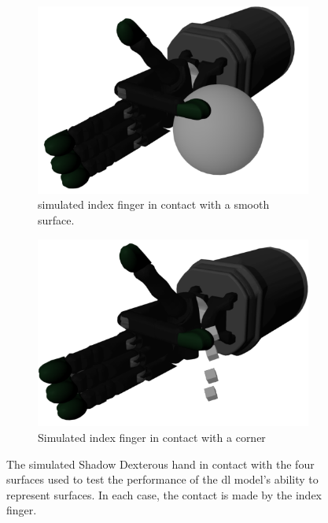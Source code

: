 \begin{figure}[h]
\begin{subfigure}[b]{0.24\textwidth}
	\end{subfigure}
	\hfill
	\begin{subfigure}[b]{0.24\textwidth}
		\centering
		\includegraphics[width=\textwidth]{chapters/1-tactile-perception/fig/experimental-setup/smooth-contact.png}
		\caption{simulated index finger in contact with a smooth surface.}
		\label{fig:smooth-contact-experimental}
	\end{subfigure}
	\hfill
	\begin{subfigure}[b]{0.24\textwidth}
		\centering
		\includegraphics[width=\textwidth]{chapters/1-tactile-perception/fig/experimental-setup/corner-contact.png}
		\caption{Simulated index finger in contact with a corner}
		\label{fig:corner-contact-experimental}
	\end{subfigure}
		\caption{The simulated Shadow Dexterous hand in contact with the four surfaces used to test the performance of the \gls{dl} model's ability to represent surfaces. In each case, the contact is made by the index finger.}
		\label{fig:experimental-setup-tactile-perception-experimental}
\end{figure}

